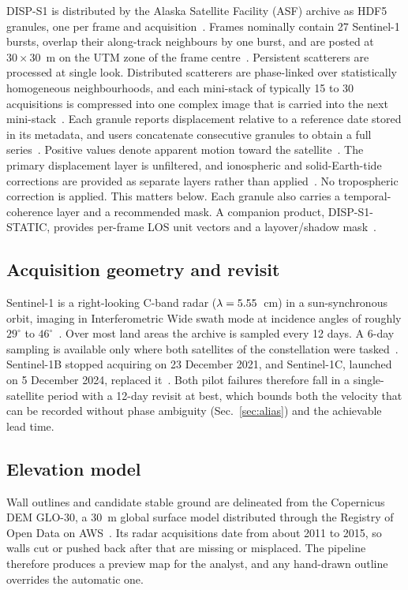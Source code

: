 \documentclass[aps,prd,twocolumn,superscriptaddress,nofootinbib,floatfix,preprintnumbers,10pt]{revtex4-2}
\begin{document}
DISP-S1 is distributed by the Alaska Satellite Facility (ASF) archive as HDF5 granules, one per frame and acquisition~\cite{OperaDISP}. Frames nominally contain 27 Sentinel-1 bursts, overlap their along-track neighbours by one burst, and are posted at $30\times30$~m on the UTM zone of the frame centre~\cite{OperaATBD2025}. Persistent scatterers are processed at single look. Distributed scatterers are phase-linked over statistically homogeneous neighbourhoods, and each mini-stack of typically 15 to 30 acquisitions is compressed into one complex image that is carried into the next mini-stack~\cite{OperaATBD2025,Staniewicz2025}. Each granule reports displacement relative to a reference date stored in its metadata, and users concatenate consecutive granules to obtain a full series~\cite{OperaATBD2025}. Positive values denote apparent motion toward the satellite~\cite{OperaATBD2025}. The primary displacement layer is unfiltered, and ionospheric and solid-Earth-tide corrections are provided as separate layers rather than applied~\cite{OperaATBD2025}. No tropospheric correction is applied. This matters below. Each granule also carries a temporal-coherence layer and a recommended mask. A companion product, DISP-S1-STATIC, provides per-frame LOS unit vectors and a layover/shadow mask~\cite{OperaStatic}.

\subsection{Acquisition geometry and revisit}

Sentinel-1 is a right-looking C-band radar ($\lambda=5.55$~cm) in a sun-synchronous orbit, imaging in Interferometric Wide swath mode at incidence angles of roughly $29^\circ$ to $46^\circ$~\cite{Torres2012}. Over most land areas the archive is sampled every 12 days. A 6-day sampling is available only where both satellites of the constellation were tasked~\cite{ASFS1}. Sentinel-1B stopped acquiring on 23 December 2021, and Sentinel-1C, launched on 5 December 2024, replaced it~\cite{ASFS1}. Both pilot failures therefore fall in a single-satellite period with a 12-day revisit at best, which bounds both the velocity that can be recorded without phase ambiguity (Sec.~\ref{sec:alias}) and the achievable lead time.

\subsection{Elevation model}

Wall outlines and candidate stable ground are delineated from the Copernicus DEM GLO-30, a 30~m global surface model distributed through the Registry of Open Data on AWS~\cite{CopDEM}. Its radar acquisitions date from about 2011 to 2015, so walls cut or pushed back after that are missing or misplaced. The pipeline therefore produces a preview map for the analyst, and any hand-drawn outline overrides the automatic one.
\end{document}
